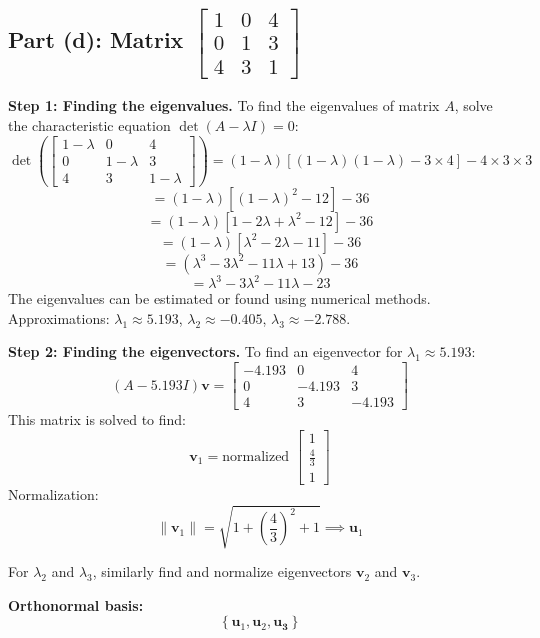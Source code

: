 \documentclass[12pt]{article}
\begin{document}
\subsection*{Part (d): Matrix \( \begin{bmatrix} 1 & 0 & 4 \\ 0 & 1 & 3 \\ 4 & 3 & 1 \end{bmatrix} \)}
\textbf{Step 1: Finding the eigenvalues.}
To find the eigenvalues of matrix \(A\), solve the characteristic equation \(\det(A - \lambda I) = 0\):
\[
\det\left( \begin{bmatrix} 1 - \lambda & 0 & 4 \\ 0 & 1 - \lambda & 3 \\ 4 & 3 & 1 - \lambda \end{bmatrix} \right) = (1 - \lambda) \left[ (1 - \lambda)(1 - \lambda) - 3 \times 4 \right] - 4 \times 3 \times 3
\]
\[
= (1 - \lambda) \left[ (1 - \lambda)^2 - 12 \right] - 36
\]
\[
= (1 - \lambda) \left[ 1 - 2\lambda + \lambda^2 - 12 \right] - 36
\]
\[
= (1 - \lambda) \left[ \lambda^2 - 2\lambda - 11 \right] - 36
\]
\[
= (\lambda^3 - 3\lambda^2 - 11\lambda + 13) - 36
\]
\[
= \lambda^3 - 3\lambda^2 - 11\lambda - 23
\]
The eigenvalues can be estimated or found using numerical methods. Approximations: \(\lambda_1 \approx 5.193\), \(\lambda_2 \approx -0.405\), \(\lambda_3 \approx -2.788\).

\textbf{Step 2: Finding the eigenvectors.}
To find an eigenvector for \(\lambda_1 \approx 5.193\):
\[
(A - 5.193I)\mathbf{v} = \begin{bmatrix} -4.193 & 0 & 4 \\ 0 & -4.193 & 3 \\ 4 & 3 & -4.193 \end{bmatrix}
\]
This matrix is solved to find:
\[
\mathbf{v}_1 = \text{normalized } \begin{bmatrix} 1 \\ \frac{4}{3} \\ 1 \end{bmatrix}
\]
Normalization:
\[
\|\mathbf{v}_1\| = \sqrt{1 + \left(\frac{4}{3}\right)^2 + 1} \implies \mathbf{u}_1
\]

For \(\lambda_2\) and \(\lambda_3\), similarly find and normalize eigenvectors \(\mathbf{v}_2\) and \(\mathbf{v}_3\).

\textbf{Orthonormal basis:}
\[
\left\{ \mathbf{u}_1, \mathbf{u}_2, \mathbf{u_3} \right\}
\]
\end{document}
